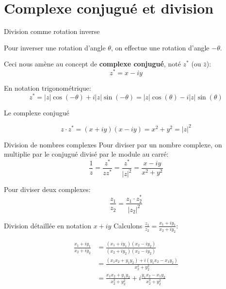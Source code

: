 \documentclass[aspectratio=169,12pt]{beamer}
\begin{document}
\section{Complexe conjugué et division}

\begin{frame}{Division comme rotation inverse}
  
  Pour inverser une rotation d'angle $\theta$, on effectue une rotation d'angle $-\theta$.
  
  \bigskip
  Ceci nous amène au concept de \textbf{complexe conjugué}, noté $z^*$ (ou $\bar{z}$):
  \[
    z^* = x - iy
  \]
  
  En notation trigonométrique:
  \[
    z^* = |z|\cos(-\theta) + i|z|\sin(-\theta) = |z|\cos(\theta) - i|z|\sin(\theta)
  \]
  
\end{frame}

\begin{frame}{Le complexe conjugué}
  \begin{center}
  \end{center}
  
  \[
    z \cdot z^* = (x + iy)(x - iy) = x^2 + y^2 = |z|^2
  \]
\end{frame}

\begin{frame}{Division de nombres complexes}
  Pour diviser par un nombre complexe, on multiplie par le conjugué divisé par le module au carré:
  \[
    \frac{1}{z} = \frac{z^*}{zz^*} = \frac{z^*}{|z|^2} = \frac{x - iy}{x^2 + y^2}
  \]
  
  \bigskip
  Pour diviser deux complexes:
  \[
    \frac{z_1}{z_2} = \frac{z_1 \cdot z_2^*}{|z_2|^2}
  \]
\end{frame}

\begin{frame}{Division détaillée en notation $x + iy$}
  Calculons $\frac{z_1}{z_2} = \frac{x_1 + iy_1}{x_2 + iy_2}$:
  
  \begin{align*}
    \frac{x_1 + iy_1}{x_2 + iy_2} &= \frac{(x_1 + iy_1)(x_2 - iy_2)}{(x_2 + iy_2)(x_2 - iy_2)} \\
    &= \frac{(x_1 x_2 + y_1 y_2) + i(y_1 x_2 - x_1 y_2)}{x_2^2 + y_2^2} \\
    &= \frac{x_1 x_2 + y_1 y_2}{x_2^2 + y_2^2} + i\frac{y_1 x_2 - x_1 y_2}{x_2^2 + y_2^2}
  \end{align*}
\end{frame}
\end{document}
